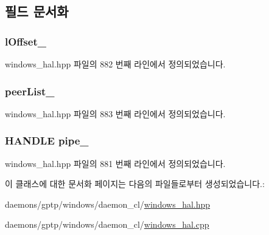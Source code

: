 \subsection{필드 문서화}
\subsubsection[{\texorpdfstring{l\+Offset\+\_\+}{lOffset_}}]{ l\+Offset\+\_\+\hspace{0.3cm}{\ttfamily [private]}}\hypertarget{class_windows_named_pipe_i_p_c_a5b017962912e5549312d6017c48345a8}{}\label{class_windows_named_pipe_i_p_c_a5b017962912e5549312d6017c48345a8}


windows\+\_\+hal.\+hpp 파일의 882 번째 라인에서 정의되었습니다.

\subsubsection[{\texorpdfstring{peer\+List\+\_\+}{peerList_}}]{ peer\+List\+\_\+\hspace{0.3cm}{\ttfamily [private]}}\hypertarget{class_windows_named_pipe_i_p_c_a14d4ab8d3c4d6d39463defa27105912d}{}\label{class_windows_named_pipe_i_p_c_a14d4ab8d3c4d6d39463defa27105912d}


windows\+\_\+hal.\+hpp 파일의 883 번째 라인에서 정의되었습니다.

\subsubsection[{\texorpdfstring{pipe\+\_\+}{pipe_}}]{\setlength{\rightskip}{0pt plus 5cm}H\+A\+N\+D\+LE pipe\+\_\+\hspace{0.3cm}{\ttfamily [private]}}\hypertarget{class_windows_named_pipe_i_p_c_a4757a4c2a34a6b9ea12d3be6bc37c9a3}{}\label{class_windows_named_pipe_i_p_c_a4757a4c2a34a6b9ea12d3be6bc37c9a3}


windows\+\_\+hal.\+hpp 파일의 881 번째 라인에서 정의되었습니다.



이 클래스에 대한 문서화 페이지는 다음의 파일들로부터 생성되었습니다.\+:\begin{DoxyCompactItemize}
\item 
daemons/gptp/windows/daemon\+\_\+cl/\hyperlink{windows__hal_8hpp}{windows\+\_\+hal.\+hpp}\item 
daemons/gptp/windows/daemon\+\_\+cl/\hyperlink{windows__hal_8cpp}{windows\+\_\+hal.\+cpp}\end{DoxyCompactItemize}
